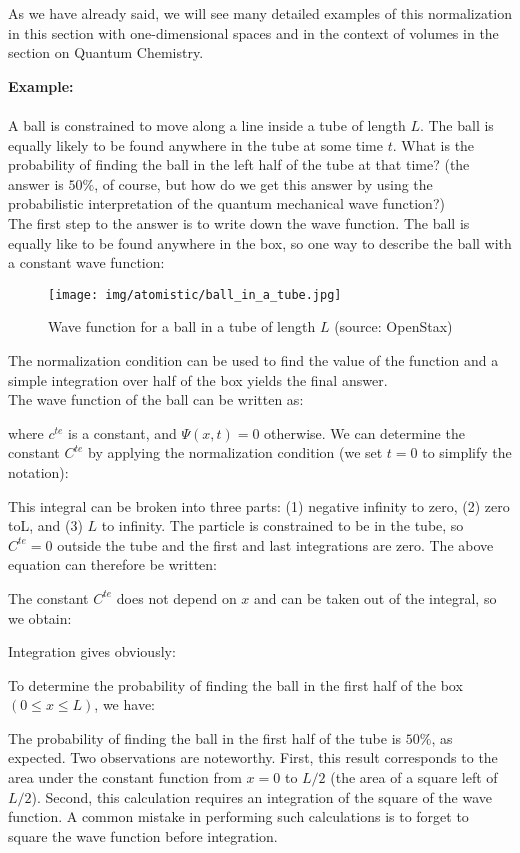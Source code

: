 	As we have already said, we will see many detailed examples of this normalization in this section with one-dimensional spaces and in the context of volumes in the section on Quantum Chemistry.
	 \begin{tcolorbox}[colframe=black,colback=white,sharp corners]
	\textbf{{\Large {}}Example:}\\\\
	A ball is constrained to move along a line inside a tube of length $L$. The ball is equally likely to be found anywhere in the tube at some time $t$. What is the probability of finding the ball in the left half of the tube at that time? (the answer is $50\%$, of course, but how do we get this answer by using the probabilistic interpretation of the quantum mechanical wave function?)\\
	
	The first step to the answer is to write down the wave function. The ball is equally like to be found anywhere in the box, so one way to describe the ball with a constant wave function:
	\begin{figure}[H]
		\centering
		\texttt{[image: img/atomistic/ball\_in\_a\_tube.jpg]}	
		\caption[]{Wave function for a ball in a tube of length $L$ (source: OpenStax)}
	\end{figure}
	The normalization condition can be used to find the value of the function and a simple integration over half of the box yields the final answer.\\
	
	The wave function of the ball can be written as:
	
	where $c^{te}$ is a constant, and  $\Psi(x,t)=0$ otherwise. We can determine the constant $C^{te}$ by applying the normalization condition (we set  $t=0$  to simplify the notation):
	
	This integral can be broken into three parts: (1) negative infinity to zero, (2) zero to$ $L, and (3) $L$ to infinity. The particle is constrained to be in the tube, so $C^{te}=0$ outside the tube and the first and last integrations are zero. The above equation can therefore be written:
	
	\end{tcolorbox}
	
	\begin{tcolorbox}[colframe=black,colback=white,sharp corners]
	The constant $C^{te}$ does not depend on $x$ and can be taken out of the integral, so we obtain:
	
	Integration gives obviously:
	
	To determine the probability of finding the ball in the first half of the box $( 0\le x\le L)$, we have:
	
	The probability of finding the ball in the first half of the tube is $50\%$, as expected. Two observations are noteworthy. First, this result corresponds to the area under the constant function from $x=0$ to $L/2$ (the area of a square left of $L/2$). Second, this calculation requires an integration of the square of the wave function. A common mistake in performing such calculations is to forget to square the wave function before integration.
	\end{tcolorbox}
	
